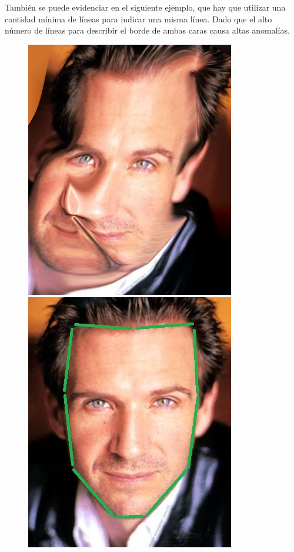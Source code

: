 \documentclass[conference]{IEEEtran}
\begin{document}
	También se puede evidenciar en el siguiente ejemplo, que hay que utilizar una cantidad mínima de líneas para indicar una misma línea. Dado que el alto número de líneas para describir el borde de ambas caras causa altas anomalías.
\begin{figure}[H]
\begin{multicols}{3}
    \centering
    
    \includegraphics[width=0.65\linewidth]{errors/02/img01.png} \par
    \includegraphics[width=0.65\linewidth]{errors/02/1 lines.jpg} \par 

\end{multicols}
\end{figure}
\end{document}
